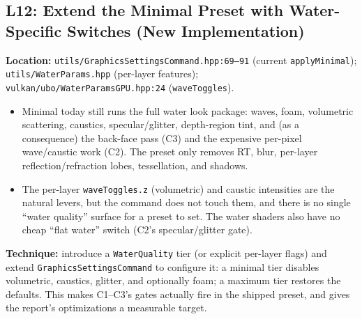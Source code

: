 \documentclass[11pt,a4paper]{article}
\begin{document}
\subsection{L12: Extend the Minimal Preset with Water-Specific Switches (New Implementation)}

\textbf{Location:} \texttt{utils/GraphicsSettingsCommand.hpp:69--91} (current \texttt{applyMinimal}); \texttt{utils/WaterParams.hpp} (per-layer features);
\texttt{vulkan/ubo/WaterParamsGPU.hpp:24} (\texttt{waveToggles}).

\begin{itemize}
    \item Minimal today still runs the full water look package: waves, foam, volumetric scattering, caustics, specular/glitter, depth-region tint, and (as a consequence) the
    back-face pass (C3) and the expensive per-pixel wave/caustic work (C2). The preset only removes RT, blur, per-layer reflection/refraction lobes, tessellation, and shadows.
    \item The per-layer \texttt{waveToggles.z} (volumetric) and caustic intensities are the natural levers, but the command does not touch them, and there is no single ``water
    quality'' surface for a preset to set. The water shaders also have no cheap ``flat water'' switch (C2's specular/glitter gate).
\end{itemize}

\textbf{Technique:} introduce a \texttt{WaterQuality} tier (or explicit per-layer flags) and extend \texttt{GraphicsSettingsCommand} to configure it: a minimal tier disables
volumetric, caustics, glitter, and optionally foam; a maximum tier restores the defaults. This makes C1--C3's gates actually fire in the shipped preset, and gives the report's
optimizations a measurable target.
\end{document}

